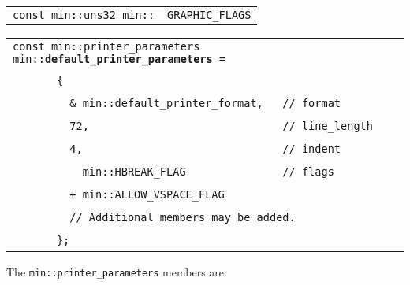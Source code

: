 \documentclass[12pt]{article}
\makeatletter
\newcommand{\ttindex}[1]{\index{#1@{\tt #1}}}
\newcommand{\minindex}[1]{\ttindex{min::#1}\ttindex{#1}}
\newenvironment{indpar}[1][0.3in]%
	{\begin{list}{}%
		     {\setlength{\itemsep}{0in}%
		      \setlength{\topsep}{0in}%
		      \setlength{\parsep}{1ex}%
		      \setlength{\labelwidth}{#1}%
		      \setlength{\leftmargin}{#1}%
		      \addtolength{\leftmargin}{\labelsep}}%
	 \item}%
	{\end{list}}
\newcommand{\LABEL}[1]{\label{#1}}
\newcommand{\ARGBREAK}{\\&{\tt ~~~~}}
\newcommand{\MINKEY}[1]{{\tt \bf #1}\minindex{#1}}
\newcommand{\MINNBKEY}[1]{{\tt #1}\minindex{#1}}
\makeatother
\begin{document}
\begin{indpar}[1em]\begin{tabular}{r@{}l}
\verb|const min::uns32 min::| & \MINNBKEY{GRAPHIC\_FLAGS}
\LABEL{MIN::GRAPHIC_FLAGS} \\
\end{tabular}\end{indpar}

\begin{indpar}[1em]\begin{tabular}{r@{}l}
\multicolumn{2}{l}{\tt const min::printer\_parameters
                       min::\MINKEY{default\_printer\_parameters} =}\ARGBREAK
    \verb|{|\ARGBREAK
    \verb|  & min::default_printer_format,   // format|\ARGBREAK
    \verb|  72,                              // line_length|\ARGBREAK
    \verb|  4,                               // indent|\ARGBREAK
    \verb|    min::HBREAK_FLAG               // flags|\ARGBREAK
    \verb|  + min::ALLOW_VSPACE_FLAG|\ARGBREAK
    \verb|  // Additional members may be added.|\ARGBREAK
    \verb|};|
\LABEL{MIN::DEFAULT_PRINTER_PARAMETERS}
\end{tabular}\end{indpar}

The {\tt min::printer\_parameters} members are:
\end{document}
